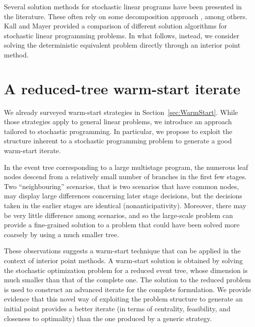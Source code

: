 Several solution methods for stochastic linear programs have been 
presented in the literature. These often rely on some decomposition
approach \cite{Birge85,LinderothWright03,MulveyRuszczynski}, among others.
Kall and Mayer \cite{KallMayer} provided a comparison of different
solution algorithms for stochastic linear programming problems.
In what follows, instead, we consider solving the deterministic equivalent
problem directly through an interior point method.


%
%
\section{A reduced-tree warm-start iterate}
\label{sec:ReducedTree}

We already surveyed warm-start strategies in Section~\ref{sec:WarmStart}.
While those strategies apply to
general linear problems, we introduce an approach tailored to
stochastic programming. In particular, we propose to exploit the structure
inherent to a stochastic programming problem to generate a good 
warm-start iterate.

In the event tree corresponding to a large multistage program, 
the numerous leaf nodes descend from a relatively small number of 
branches in the first few stages. Two ``neighbouring'' scenarios, 
that is two scenarios that have common nodes, may display large 
differences concerning later stage decisions, but the decisions 
taken in the earlier stages are identical (nonanticipativity).
Moreover, there may be very little difference among 
scenarios, and so the large-scale problem can provide a fine-grained 
solution to a problem that could have been solved more coarsely by 
using a much smaller tree. 

These observations suggests a
warm-start technique that can be applied in the context of interior 
point methods. A warm-start solution is obtained by solving the 
stochastic optimization problem for a reduced event tree, whose 
dimension is much smaller than that of the complete one. The solution 
to the reduced problem is used to construct an advanced iterate for 
the complete formulation. We provide evidence that this novel way 
of exploiting the problem structure to generate an initial point 
provides a better iterate (in terms of centrality, feasibility, 
and closeness to optimality) than the one produced by a generic 
strategy.


